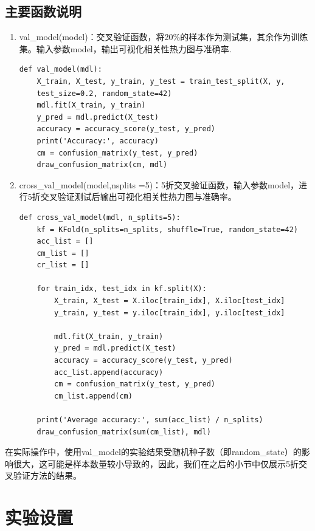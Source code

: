 \documentclass[a4paper,12pt,onecolumn,oneside]{article}
\begin{document}
\subsection{主要函数说明}
\begin{enumerate}
	\item val\_model(model)：交叉验证函数，将20\%的样本作为测试集，其余作为训练集。输入参数model，输出可视化相关性热力图与准确率.
	\lstset{language=Python}
	\lstset{frame=lines}
	\lstset{basicstyle=\footnotesize}
	\begin{lstlisting}
def val_model(mdl):
	X_train, X_test, y_train, y_test = train_test_split(X, y, 
	test_size=0.2, random_state=42)
	mdl.fit(X_train, y_train)
	y_pred = mdl.predict(X_test)
	accuracy = accuracy_score(y_test, y_pred)
	print('Accuracy:', accuracy)
	cm = confusion_matrix(y_test, y_pred)
	draw_confusion_matrix(cm, mdl)
	\end{lstlisting}
	\item cross\_val\_model(model,nsplits =5)：5折交叉验证函数，输入参数model，进行5折交叉验证测试后输出可视化相关性热力图与准确率。
	\lstset{language=Python}
	\lstset{frame=lines}
	\lstset{basicstyle=\footnotesize}
	\begin{lstlisting}
def cross_val_model(mdl, n_splits=5):
	kf = KFold(n_splits=n_splits, shuffle=True, random_state=42)
	acc_list = []
	cm_list = []
	cr_list = []
		
	for train_idx, test_idx in kf.split(X):
		X_train, X_test = X.iloc[train_idx], X.iloc[test_idx]
		y_train, y_test = y.iloc[train_idx], y.iloc[test_idx]
		
		mdl.fit(X_train, y_train)
		y_pred = mdl.predict(X_test)
		accuracy = accuracy_score(y_test, y_pred)
		acc_list.append(accuracy)
		cm = confusion_matrix(y_test, y_pred)
		cm_list.append(cm)
		
	print('Average accuracy:', sum(acc_list) / n_splits)
	draw_confusion_matrix(sum(cm_list), mdl)
	\end{lstlisting}
\end{enumerate}
在实际操作中，使用val\_model的实验结果受随机种子数（即random\_state）的影响很大，这可能是样本数量较小导致的，因此，我们在之后的小节中仅展示5折交叉验证方法的结果。
\newpage
\section{实验设置}
\vspace{-\baselineskip}
\end{document}
